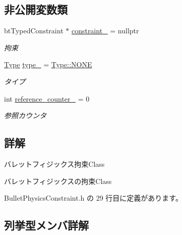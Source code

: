 \subsection*{非公開変数類}
\begin{DoxyCompactItemize}
\item 
bt\+Typed\+Constraint $\ast$ \mbox{\hyperlink{class_bullet_physics_constraint_ac802be61cfbd2045affa8c5718eaa13a}{constraint\+\_\+}} = nullptr
\begin{DoxyCompactList}\small\item\em 拘束 \end{DoxyCompactList}\item 
\mbox{\hyperlink{class_bullet_physics_constraint_ad85080d0a6ff58365f4f6fa4c9381e24}{Type}} \mbox{\hyperlink{class_bullet_physics_constraint_a7f8eee5114f4c45013d052deab208ef4}{type\+\_\+}} = \mbox{\hyperlink{class_bullet_physics_constraint_ad85080d0a6ff58365f4f6fa4c9381e24ab50339a10e1de285ac99d4c3990b8693}{Type\+::\+N\+O\+NE}}
\begin{DoxyCompactList}\small\item\em タイプ \end{DoxyCompactList}\item 
int \mbox{\hyperlink{class_bullet_physics_constraint_a8d9fae4e261d9e36cf6540edafa37792}{reference\+\_\+counter\+\_\+}} = 0
\begin{DoxyCompactList}\small\item\em 参照カウンタ \end{DoxyCompactList}\end{DoxyCompactItemize}


\subsection{詳解}
バレットフィジックス拘束\+Class 

バレットフィジックスの拘束\+Class 

 Bullet\+Physics\+Constraint.\+h の 29 行目に定義があります。



\subsection{列挙型メンバ詳解}
\mbox{\label{class_bullet_physics_constraint_ad85080d0a6ff58365f4f6fa4c9381e24}} 
